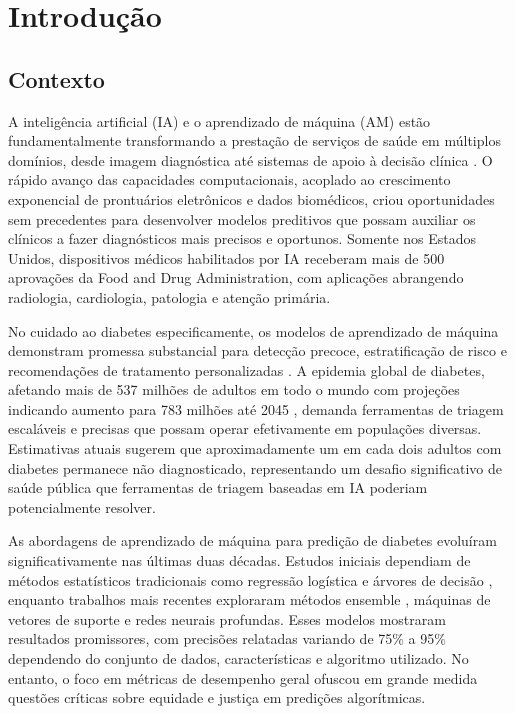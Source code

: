 
\section{Introdução}

\subsection{Contexto}

A inteligência artificial (IA) e o aprendizado de máquina (AM) estão 
fundamentalmente transformando a prestação de serviços de saúde em múltiplos 
domínios, desde imagem diagnóstica até sistemas de apoio à decisão clínica 
\cite{topol2019}. O rápido avanço das capacidades computacionais, acoplado 
ao crescimento exponencial de prontuários eletrônicos e dados biomédicos, 
criou oportunidades sem precedentes para desenvolver modelos preditivos que 
possam auxiliar os clínicos a fazer diagnósticos mais precisos e oportunos. 
Somente nos Estados Unidos, dispositivos médicos habilitados por IA receberam 
mais de 500 aprovações da Food and Drug Administration, com aplicações 
abrangendo radiologia, cardiologia, patologia e atenção primária.

No cuidado ao diabetes especificamente, os modelos de aprendizado de máquina 
demonstram promessa substancial para detecção precoce, estratificação de 
risco e recomendações de tratamento personalizadas \cite{sd2019, esteva2017}. 
A epidemia global de diabetes, afetando mais de 537 milhões de adultos em 
todo o mundo com projeções indicando aumento para 783 milhões até 2045 
\cite{idf2021}, demanda ferramentas de triagem escaláveis e precisas que 
possam operar efetivamente em populações diversas. Estimativas atuais 
sugerem que aproximadamente um em cada dois adultos com diabetes permanece 
não diagnosticado, representando um desafio significativo de saúde pública 
que ferramentas de triagem baseadas em IA poderiam potencialmente resolver.

As abordagens de aprendizado de máquina para predição de diabetes evoluíram 
significativamente nas últimas duas décadas. Estudos iniciais dependiam de 
métodos estatísticos tradicionais como regressão logística e árvores de 
decisão \cite{smith1988}, enquanto trabalhos mais recentes exploraram 
métodos ensemble \cite{breiman2001, friedman2001}, máquinas de vetores 
de suporte \cite{vapnik1995} e redes neurais profundas. Esses modelos 
mostraram resultados promissores, com precisões relatadas variando de 75\% 
a 95\% dependendo do conjunto de dados, características e algoritmo 
utilizado. No entanto, o foco em métricas de desempenho geral ofuscou 
em grande medida questões críticas sobre equidade e justiça em predições 
algorítmicas.

